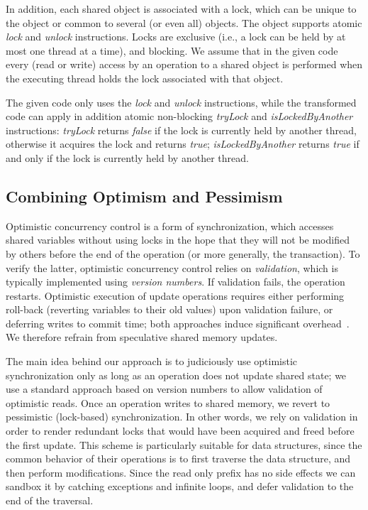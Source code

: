 In addition, each shared object is associated with a lock, which can be unique to the object or common to several (or even all) objects. 
The object supports atomic \emph{lock} and \emph{unlock} instructions.
Locks are exclusive (i.e., a lock can be held by at most one thread at a time), and blocking.
We assume that in the given code every (read
or write) access by an operation to a shared object is performed when the
executing thread holds the lock associated with that object.


The given code only uses the \emph{lock} and \emph{unlock} instructions, while the transformed code can apply in addition atomic non-blocking
\emph{tryLock}  and \emph{isLockedByAnother} instructions: 
 \emph{tryLock}  returns \emph{false} if the lock is currently held by another thread, otherwise it acquires the lock and returns \emph{true};
 \emph{isLockedByAnother}  returns \emph{true} if and only if the lock is currently held by another thread.


\subsection{Combining Optimism and Pessimism}\label{ssec:overview}

Optimistic concurrency control is a form of synchronization, which accesses shared variables without using locks in the hope that they will not be modified by others before the end of the operation (or more generally, the transaction). To verify the latter, optimistic concurrency control relies on \emph{validation}, which is typically implemented using \emph{version numbers}. If validation fails, the operation restarts. Optimistic execution of update operations requires either performing roll-back (reverting variables to their old values) upon validation failure, or deferring writes to commit time; both approaches induce significant overhead~\cite{Cascaval:2008}. We therefore refrain from speculative shared memory updates.

The main idea behind our approach is to judiciously use optimistic synchronization only as long as an operation does not update shared state;
we use a standard approach based on version numbers to allow validation of optimistic reads.
Once an operation
writes to shared memory, we revert to pessimistic (lock-based) synchronization. In
other words, we rely on validation %
in order to render redundant
locks that would have been acquired and freed before the first update.
This scheme is particularly suitable for data structures,
since the common behavior of their operations
is to first traverse the data structure, and then
perform modifications.
Since the read only prefix has no side effects we can sandbox it by catching exceptions and infinite loops, and defer validation to the end of the traversal.

